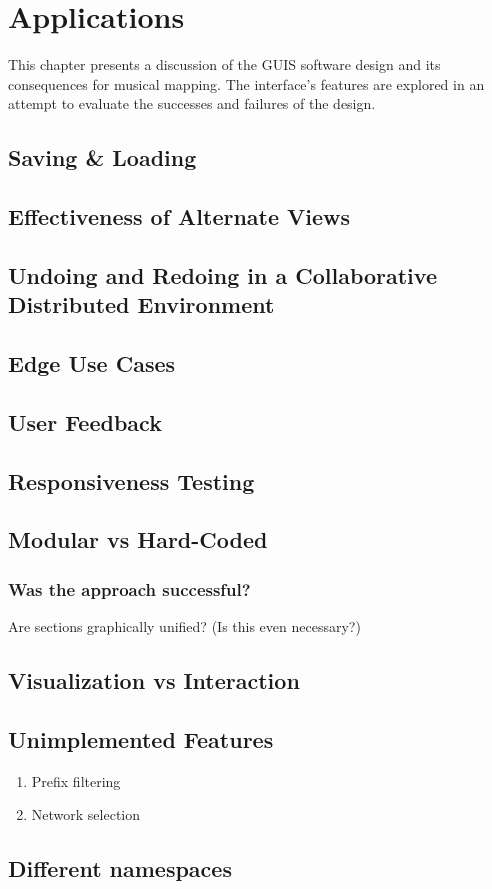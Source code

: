 \chapter{Applications}

This chapter presents a discussion of the GUIS software design and its consequences for musical mapping. The interface's features are explored in an attempt to evaluate the successes and failures of the design. 

\section{Saving \& Loading}

\section{Effectiveness of Alternate Views}

\section{Undoing and Redoing in a Collaborative Distributed Environment}

\section{Edge Use Cases}

\section{User Feedback}

\section{Responsiveness Testing}

\section{Modular vs Hard-Coded}
\subsection{Was the approach successful?}
Are sections graphically unified? (Is this even necessary?)
	
\section{Visualization vs Interaction}

\section{Unimplemented Features}
	\begin{enumerate}
		\item Prefix filtering
		\item Network selection
	\end{enumerate}

\section{Different namespaces}

